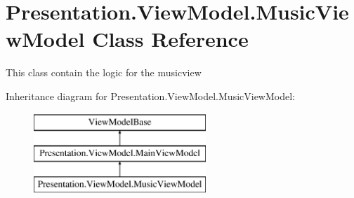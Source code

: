 \hypertarget{class_presentation_1_1_view_model_1_1_music_view_model}{}\section{Presentation.\+View\+Model.\+Music\+View\+Model Class Reference}
\label{class_presentation_1_1_view_model_1_1_music_view_model}


This class contain the logic for the musicview  


Inheritance diagram for Presentation.\+View\+Model.\+Music\+View\+Model\+:\begin{figure}[H]
\begin{center}
\leavevmode
\includegraphics[height=3.000000cm]{class_presentation_1_1_view_model_1_1_music_view_model}
\end{center}
\end{figure}
